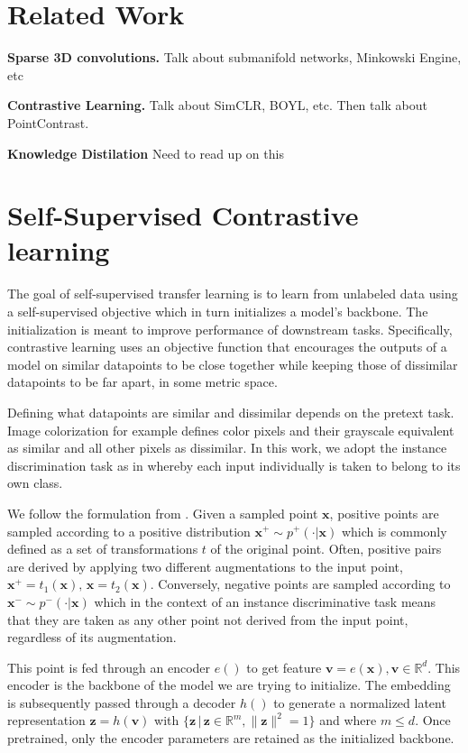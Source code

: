 \documentclass[10pt,twocolumn,letterpaper]{article}
\begin{document}
\section{Related Work}
\label{sec:relatedWork}


\textbf{Sparse 3D convolutions.} Talk about submanifold networks, Minkowski Engine, etc

\textbf{Contrastive Learning.} Talk about SimCLR, BOYL, etc. Then talk about PointContrast.

\textbf{Knowledge Distilation} Need to read up on this


\section{Self-Supervised Contrastive learning}
\label{sec:contrastiveLearning}

The goal of self-supervised transfer learning is to learn from unlabeled data using a self-supervised objective which in turn initializes a model's backbone. The initialization is meant to improve performance of downstream tasks. Specifically, contrastive learning uses an objective function that encourages the outputs of a model on similar datapoints to be close together while keeping those of dissimilar datapoints to be far apart, in some metric space.

Defining what datapoints are similar and dissimilar depends on the pretext task. Image colorization for example defines color pixels and their grayscale equivalent as similar and all other pixels as dissimilar. In this work, we adopt the instance discrimination task as in \cite{} whereby each input individually is taken to belong to its own class.

We follow the formulation from \cite{le-khac_contrastive_2020}. Given a sampled point $\mathbf{x}$, positive points are sampled according to a positive distribution $\mathbf{x}^{+} \sim p^{+}( \cdot | \mathbf{x})$ which is commonly defined as a set of transformations $t$ of the original point. Often, positive pairs are derived by applying two different augmentations to the input point, $\mathbf{x}^{+} = t_{1}(\mathbf{x}), \, \mathbf{x} = t_{2}(\mathbf{x})$. Conversely, negative points are sampled according to $\mathbf{x}^{-} \sim p^{-}( \cdot | \mathbf{x})$ which in the context of an instance discriminative task means that they are taken as any other point not derived from the input point, regardless of its augmentation.

This point is fed through an encoder $e()$ to get feature $\mathbf{v} = e(\mathbf{x}), \mathbf{v} \in \mathbb{R}^d$. This encoder is the backbone of the model we are trying to initialize. The embedding is subsequently passed through a decoder $h()$ to generate a normalized latent representation $\mathbf{z}=h(\mathbf{v})$ with $\{\mathbf{z} \, | \, \mathbf{z} \in \mathbb{R}^{m}, \lVert \mathbf{z} \lVert^{2} = 1\}$  and where $m \leq d$. Once pretrained, only the encoder parameters are retained as the initialized backbone.
\end{document}
